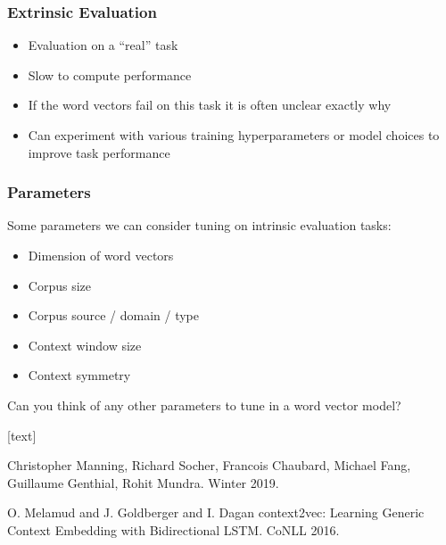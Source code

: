\begin{frame}
	\frametitle{Extrinsic Evaluation}
	\begin{itemize}[<+->]
		\item Evaluation on a ``real'' task
		\item Slow to compute performance
		\item If the word vectors fail on this task it is often unclear exactly why
		\item Can experiment with various training hyperparameters or model choices to improve task performance
	\end{itemize}
\end{frame}

\begin{frame}
	\frametitle{Parameters}
	\begin{block}{}
	Some parameters we can consider tuning on intrinsic evaluation tasks:
	\begin{itemize}[<+->]
		\item Dimension of word vectors
		\item Corpus size
		\item Corpus source / domain / type
		\item Context window size
		\item Context symmetry
	\end{itemize}
	Can you think of any other parameters to tune in a word vector model?
	\end{block}
\end{frame}


\begin{frame}
[text]
\begin{thebibliography}{10}

\alert{Christopher Manning, Richard Socher, Francois Chaubard, Michael Fang, Guillaume Genthial, Rohit Mundra.}
\newblock Winter 2019.


\alert{O. Melamud and J. Goldberger and I. Dagan}
\newblock context2vec: Learning Generic Context Embedding with Bidirectional LSTM.
\newblock CoNLL 2016.
\end{thebibliography}
\end{frame}





